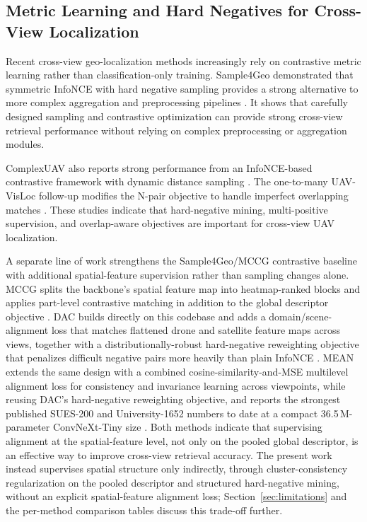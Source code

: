 \documentclass[conference]{IEEEtran}
\begin{document}
\subsection{Metric Learning and Hard Negatives for Cross-View Localization}
Recent cross-view geo-localization methods increasingly rely on contrastive
metric learning rather than classification-only training. Sample4Geo demonstrated
that symmetric InfoNCE with hard negative sampling provides a strong
alternative to more complex aggregation and preprocessing pipelines
\cite{deuser2023sample4geo}. It shows that carefully designed sampling and
contrastive optimization can provide strong cross-view retrieval performance
without relying on complex preprocessing or aggregation modules.

ComplexUAV also reports strong performance from an InfoNCE-based contrastive
framework with dynamic distance sampling \cite{chen2025complexuav}. The
one-to-many UAV-VisLoc follow-up modifies the N-pair objective to handle
imperfect overlapping matches \cite{li2025onetomany}. These studies indicate
that hard-negative mining, multi-positive supervision, and overlap-aware
objectives are important for cross-view UAV localization.

A separate line of work strengthens the Sample4Geo/MCCG contrastive baseline
with additional spatial-feature supervision rather than sampling changes alone.
MCCG splits the backbone's spatial feature map into heatmap-ranked blocks and
applies part-level contrastive matching in addition to the global descriptor
objective \cite{shen2024mccg}. DAC builds directly on this codebase and adds a
domain/scene-alignment loss that matches flattened drone and satellite feature
maps across views, together with a distributionally-robust hard-negative
reweighting objective that penalizes difficult negative pairs more heavily
than plain InfoNCE \cite{xia2024dac}. MEAN extends the same design with a
combined cosine-similarity-and-MSE multilevel alignment loss for consistency
and invariance learning across viewpoints, while reusing DAC's hard-negative
reweighting objective, and reports the strongest published SUES-200 and
University-1652 numbers to date at a compact 36.5\,M-parameter ConvNeXt-Tiny
size \cite{chen2025mean}. Both methods indicate that supervising alignment at
the spatial-feature level, not only on the pooled global descriptor, is an
effective way to improve cross-view retrieval accuracy. The present work
instead supervises spatial structure only indirectly, through
cluster-consistency regularization on the pooled descriptor and structured
hard-negative mining, without an explicit spatial-feature alignment loss;
Section~\ref{sec:limitations} and the per-method comparison tables discuss
this trade-off further.
\end{document}
